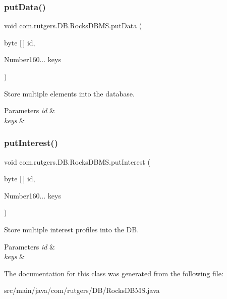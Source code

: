 \subsubsection{\texorpdfstring{put\+Data()}{putData()}\hspace{0.1cm}{\footnotesize\ttfamily [2/2]}}
{\footnotesize\ttfamily void com.\+rutgers.\+D\+B.\+Rocks\+D\+B\+M\+S.\+put\+Data (\begin{DoxyParamCaption}\item[{byte \mbox{[}$\,$\mbox{]}}]{id,  }\item[{Number160...}]{keys }\end{DoxyParamCaption})}

Store multiple elements into the database. 
\begin{DoxyParams}{Parameters}
{\em id} & \\
\hline
{\em keys} & \\
\hline
\end{DoxyParams}
\mbox{\label{classcom_1_1rutgers_1_1DB_1_1RocksDBMS_a61ac1a0207af7dff4cc4de59f10fbcc8}} 
\subsubsection{\texorpdfstring{put\+Interest()}{putInterest()}}
{\footnotesize\ttfamily void com.\+rutgers.\+D\+B.\+Rocks\+D\+B\+M\+S.\+put\+Interest (\begin{DoxyParamCaption}\item[{byte \mbox{[}$\,$\mbox{]}}]{id,  }\item[{Number160...}]{keys }\end{DoxyParamCaption})}

Store multiple interest profiles into the DB. 
\begin{DoxyParams}{Parameters}
{\em id} & \\
\hline
{\em keys} & \\
\hline
\end{DoxyParams}


The documentation for this class was generated from the following file\+:\begin{DoxyCompactItemize}
\item 
src/main/java/com/rutgers/\+D\+B/Rocks\+D\+B\+M\+S.\+java\end{DoxyCompactItemize}
